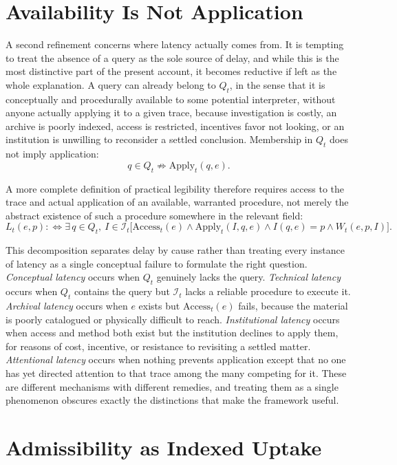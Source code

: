\section{Availability Is Not Application}

A second refinement concerns where latency actually comes from. It is tempting to treat the absence of a query as the sole source of delay, and while this is the most distinctive part of the present account, it becomes reductive if left as the whole explanation. A query can already belong to $Q_t$, in the sense that it is conceptually and procedurally available to some potential interpreter, without anyone actually applying it to a given trace, because investigation is costly, an archive is poorly indexed, access is restricted, incentives favor not looking, or an institution is unwilling to reconsider a settled conclusion. Membership in $Q_t$ does not imply application:
\[
q \in Q_t \not\Rightarrow \mathrm{Apply}_t(q,e).
\]

A more complete definition of practical legibility therefore requires access to the trace and actual application of an available, warranted procedure, not merely the abstract existence of such a procedure somewhere in the relevant field:
\[
L_t(e,p) :\Leftrightarrow \exists\, q \in Q_t,\ I \in \mathcal{I}_t \Big[ \mathrm{Access}_t(e) \land \mathrm{Apply}_t(I,q,e) \land I(q,e)=p \land W_t(e,p,I) \Big].
\]

This decomposition separates delay by cause rather than treating every instance of latency as a single conceptual failure to formulate the right question. \emph{Conceptual latency} occurs when $Q_t$ genuinely lacks the query. \emph{Technical latency} occurs when $Q_t$ contains the query but $\mathcal{I}_t$ lacks a reliable procedure to execute it. \emph{Archival latency} occurs when $e$ exists but $\mathrm{Access}_t(e)$ fails, because the material is poorly catalogued or physically difficult to reach. \emph{Institutional latency} occurs when access and method both exist but the institution declines to apply them, for reasons of cost, incentive, or resistance to revisiting a settled matter. \emph{Attentional latency} occurs when nothing prevents application except that no one has yet directed attention to that trace among the many competing for it. These are different mechanisms with different remedies, and treating them as a single phenomenon obscures exactly the distinctions that make the framework useful.

\section{Admissibility as Indexed Uptake}

